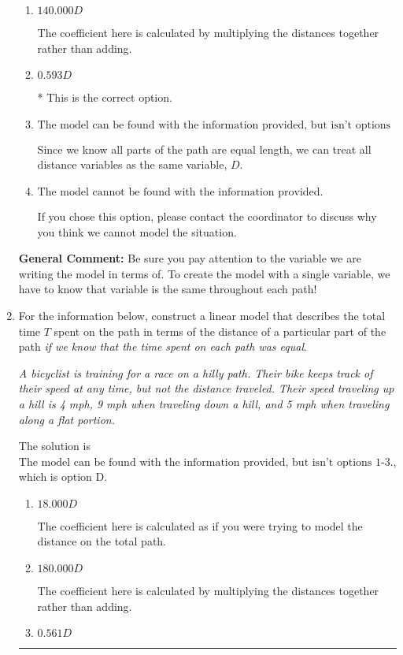 \documentclass{extbook}[14pt]
\newcommand{\litem}[1]{\item #1

\rule{\textwidth}{0.4pt}}
\begin{document}
\begin{enumerate}
{\begin{enumerate}[label=\Alph*.]
The coefficient here is calculated as if you were trying to model the distance on the total path.
\item \( 140.000 D \)

The coefficient here is calculated by multiplying the distances together rather than adding.
\item \( 0.593 D \)

* This is the correct option.
\item \( \text{The model can be found with the information provided, but isn't options 1-3.} \)

Since we know all parts of the path are equal length, we can treat all distance variables as the same variable, $D$.
\item \( \text{The model cannot be found with the information provided.} \)

If you chose this option, please contact the coordinator to discuss why you think we cannot model the situation.
\end{enumerate}

\textbf{General Comment:} Be sure you pay attention to the variable we are writing the model in terms of. To create the model with a single variable, we have to know that variable is the same throughout each path!
}
\litem{
For the information below, construct a linear model that describes the total time $T$ spent on the path in terms of the distance of a particular part of the path \textit{if we know that the time spent on each path was equal}.

\begin{center}
    \textit{ A bicyclist is training for a race on a hilly path. Their bike keeps track of their speed at any time, but not the distance traveled. Their speed traveling up a hill is 4 mph, 9 mph when traveling down a hill, and 5 mph when traveling along a flat portion. }
\end{center}
The solution is \( \text{The model can be found with the information provided, but isn't options 1-3.} \), which is option D.\begin{enumerate}[label=\Alph*.]
\item \( 18.000 D \)

The coefficient here is calculated as if you were trying to model the distance on the total path.
\item \( 180.000 D \)

The coefficient here is calculated by multiplying the distances together rather than adding.
\item \( 0.561 D \)


\end{enumerate}}
\end{enumerate}
\end{document}
